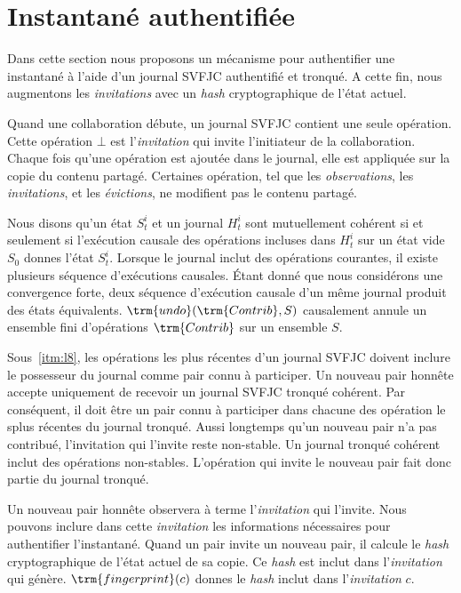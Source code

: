 \section{Instantané authentifiée}

Dans cette section nous proposons un mécanisme pour authentifier une instantané à l'aide d'un journal \ac{SVFJC} authentifié et tronqué.
A cette fin, nous augmentons les \emph{invitations} avec un \emph{hash} cryptographique de l'état actuel.

Quand une collaboration débute, un journal \ac{SVFJC} contient une seule opération.
Cette opération $\bot$ est l'\emph{invitation} qui invite l'initiateur de la collaboration.
Chaque fois qu'une opération est ajoutée dans le journal, elle est appliquée sur la copie du contenu partagé.
Certaines opération, tel que les \emph{observations}, les \emph{invitations}, et les \emph{évictions}, ne modifient pas le contenu partagé.

Nous disons qu'un état $S^i_t$ et un journal $H^i_t$ sont mutuellement cohérent si et seulement si l'exécution causale des opérations incluses dans $H^i_t$ sur un état vide $S_0$ donnes l'état $S^i_t$.
Lorsque le journal inclut des opérations courantes, il existe plusieurs séquence d'exécutions causales.
Étant donné que nous considérons une convergence forte, deux séquence d'exécution causale d'un même journal produit des états équivalents.
$\trm{undo}(\trm{Contrib}, S)$ causalement annule un ensemble fini d'opérations $\trm{Contrib}$ sur un ensemble $S$.

Sous~\ref{itm:l8}, les opérations les plus récentes d'un journal \ac{SVFJC} doivent inclure le possesseur du journal comme pair connu à participer.
Un nouveau pair honnête accepte uniquement de recevoir un journal \ac{SVFJC}
tronqué cohérent.
Par conséquent, il doit être un pair connu à participer dans chacune des opération le splus récentes du journal tronqué.
Aussi longtemps qu'un nouveau pair n'a pas contribué, l'invitation qui l'invite reste non-stable.
Un journal tronqué cohérent inclut des opérations non-stables.
L'opération qui invite le nouveau pair fait donc partie du journal tronqué.

Un nouveau pair honnête observera à terme l'\emph{invitation} qui l'invite.
Nous pouvons inclure dans cette \emph{invitation} les informations nécessaires pour authentifier l'instantané.
Quand un pair invite un nouveau pair, il calcule le \emph{hash} cryptographique de l'état actuel de sa copie.
Ce \emph{hash} est inclut dans l'\emph{invitation} qui génère.
$\trm{fingerprint}(c)$ donnes le \emph{hash} inclut dans l'\emph{invitation} $c$.

